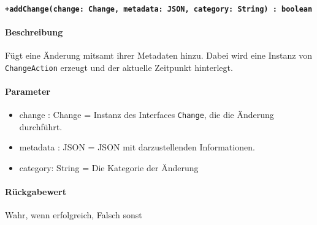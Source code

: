 \paragraph{\texttt{+addChange(change: Change, metadata: JSON, category: String) : boolean}}%
\paragraph*{Beschreibung}
Fügt eine Änderung mitsamt ihrer Metadaten hinzu.
Dabei wird eine Instanz von \verb#ChangeAction# erzeugt und der aktuelle Zeitpunkt hinterlegt.
\paragraph*{Parameter}
\begin{itemize}
    \item change : Change = Instanz des Interfaces \verb#Change#, die die Änderung durchführt.
    \item metadata : JSON = JSON mit darzustellenden Informationen.
    \item category: String = Die Kategorie der Änderung
\end{itemize}
\paragraph*{Rückgabewert}
Wahr, wenn erfolgreich, Falsch sonst
